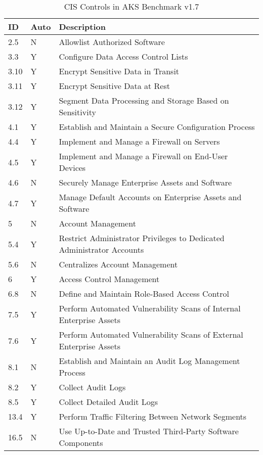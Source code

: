 \begin{table}[ht]
  \caption{CIS Controls in AKS Benchmark v1.7}
    \begin{tabular}{| l | l | l |}
    \hline
    ID & Auto & Description \\
    \hline\hline
    2.5 & N & Allowlist Authorized Software \\
    \hline
    3.3 & Y & Configure Data Access Control Lists \\
    \hline
    3.10 & Y & Encrypt Sensitive Data in Transit \\
    \hline
    3.11 & Y & Encrypt Sensitive Data at Rest \\
    \hline
    3.12 & Y & Segment Data Processing and Storage Based on Sensitivity \\
    \hline
    4.1 & Y & Establish and Maintain a Secure Configuration Process \\
    \hline
    4.4 & Y & Implement and Manage a Firewall on Servers \\
    \hline
    4.5 & Y & Implement and Manage a Firewall on End-User Devices \\
    \hline
    4.6 & N & Securely Manage Enterprise Assets and Software \\
    \hline
    4.7 & Y & Manage Default Accounts on Enterprise Assets and Software \\
    \hline
    5 & N & Account Management \\
    \hline
    5.4 & Y & Restrict Administrator Privileges to Dedicated Administrator Accounts \\
    \hline
    5.6 & N & Centralizes Account Management \\
    \hline
    6 & Y & Access Control Management \\
    \hline
    6.8 & N & Define and Maintain Role-Based Access Control \\
    \hline
    7.5 & Y & Perform Automated Vulnerability Scans of Internal Enterprise Assets \\
    \hline
    7.6 & Y & Perform Automated Vulnerability Scans of External  Enterprise Assets \\
     \hline
    8.1 & N & Establish and Maintain an Audit Log Management Process \\
    \hline
    8.2 & Y & Collect Audit Logs \\
    \hline
    8.5 & Y & Collect Detailed Audit Logs \\
    \hline
    13.4 & Y & Perform Traffic Filtering Between Network Segments \\
    \hline
    16.5 & N & Use Up-to-Date and Trusted Third-Party Software Components \\
    \hline
    \end{tabular}%
  \label{tab:aksBenchmark}%
\end{table}%

